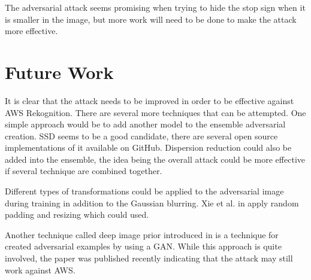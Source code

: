 \documentclass{article}
\begin{document}
The adversarial attack seems promising when trying to hide the stop sign when it is smaller in the image, but more work will need to be done to make the attack more effective.

\section{Future Work}
It is clear that the attack needs to be improved in order to be effective against AWS Rekognition. There are several more techniques that can be attempted. One simple approach would be to add another model to the ensemble adversarial creation. SSD \cite{Liu2016} seems to be a good candidate, there are several open source implementations of it available on GitHub. Dispersion reduction could also be added into the ensemble, the idea being the overall attack could be more effective if several technique are combined together.

Different types of transformations could be applied to the adversarial image during training in addition to the Gaussian blurring. Xie et al. in \cite{xie2019improving} apply random padding and resizing which could used.

Another technique called deep image prior introduced in \cite{gittings2019robust} is a technique for created adversarial examples by using a GAN. While this approach is quite involved, the paper was published recently indicating that the attack may still work against AWS.

\clearpage


\end{document}
